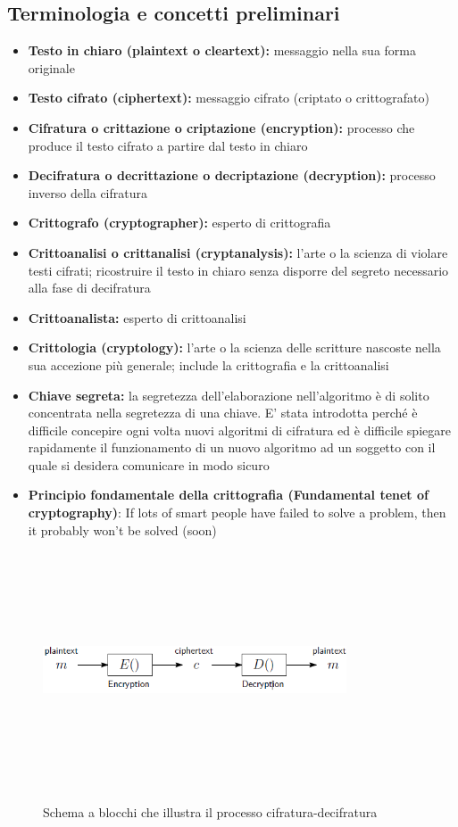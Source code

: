 \subsection{Terminologia e concetti preliminari}
\begin{itemize} 
  \item \textbf{Testo in chiaro (plaintext o cleartext):} messaggio nella sua forma originale
  \item \textbf{Testo cifrato (ciphertext):} messaggio cifrato (criptato o crittografato)
  \item \textbf{Cifratura o crittazione o criptazione (encryption):} processo che produce il testo cifrato a partire dal testo in chiaro
  \item \textbf{Decifratura o decrittazione o decriptazione (decryption):} processo inverso della cifratura
  \item \textbf{Crittografo (cryptographer):} esperto di crittografia
  \item \textbf{Crittoanalisi o crittanalisi (cryptanalysis):} l'arte o la scienza di violare testi cifrati; ricostruire il testo in chiaro senza disporre del segreto necessario alla fase di decifratura
  \item \textbf{Crittoanalista:} esperto di crittoanalisi
  \item \textbf{Crittologia (cryptology):} l'arte o la scienza delle scritture nascoste nella sua accezione più generale; include la crittografia e la crittoanalisi
  \item \textbf{Chiave segreta:} la segretezza dell'elaborazione nell'algoritmo è di solito concentrata nella segretezza di una chiave. E' stata introdotta perché è difficile concepire ogni volta nuovi algoritmi di cifratura ed è difficile spiegare rapidamente il funzionamento di un nuovo algoritmo ad un soggetto con il quale si desidera comunicare in modo sicuro
  \item \textbf{Principio fondamentale della crittografia (Fundamental tenet of cryptography)}: If lots of smart people have failed to solve a problem, then it probably won’t be solved (soon)
\end{itemize}


\begin{figure}[htbp]
	\centering%
	\subfigure%
	{\includegraphics[height=7cm, width=9cm, keepaspectratio]{Immagini/introduzione/schema_blocchi_crittografia.png}}
	\caption{Schema a blocchi che illustra il processo cifratura-decifratura \label{fig:schema_blocchi_crittografia}} 	
\end{figure}

